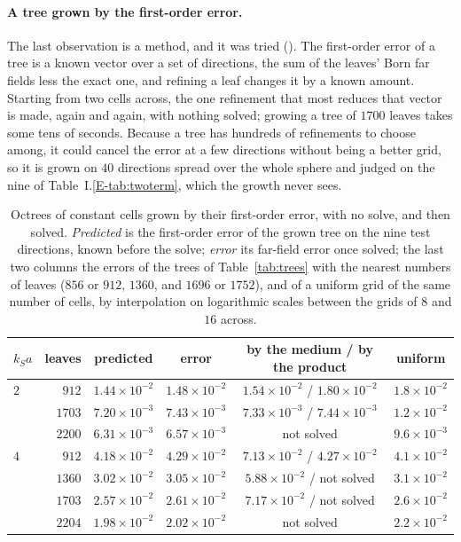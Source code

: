 \documentclass[11pt,a4paper]{article}
\begin{document}
\paragraph{A tree grown by the first-order error.} The last observation is a method, and it was tried
(). The first-order error of a tree is a known vector
over a set of directions, the sum of the leaves' Born far fields less the exact one, and refining a leaf
changes it by a known amount. Starting from two cells across, the one refinement that most reduces that
vector is made, again and again, with nothing solved; growing a tree of $1700$ leaves takes some tens of
seconds. Because a tree has hundreds of refinements to choose among, it could cancel the error at a few
directions without being a better grid, so it is grown on $40$ directions spread over the whole sphere
and judged on the nine of Table~I.\ref{E-tab:twoterm}, which the growth never sees.
\begin{table}[htbp]
\centering
\caption{Octrees of constant cells grown by their first-order error, with no solve, and then solved.
\emph{Predicted} is the first-order error of the grown tree on the nine test directions, known before the
solve; \emph{error} its far-field error once solved; the last two columns the errors of the trees of
Table~\ref{tab:trees} with the nearest numbers of leaves ($856$ or $912$, $1360$, and $1696$ or $1752$),
and of a uniform grid of the same number of cells, by interpolation on logarithmic scales between the
grids of $8$ and $16$ across.}\label{tab:greedy}
\small
\begin{tabular}{@{}lrcccc@{}}
\toprule
$k_Sa$ & leaves & predicted & error & by the medium / by the product & uniform \\
\midrule
$2$ & $912$  & $1.44\times10^{-2}$ & $1.48\times10^{-2}$ & $1.54\times10^{-2}$ / $1.80\times10^{-2}$ & $1.8\times10^{-2}$ \\
    & $1703$ & $7.20\times10^{-3}$ & $7.43\times10^{-3}$ & $7.33\times10^{-3}$ / $7.44\times10^{-3}$ & $1.2\times10^{-2}$ \\
    & $2200$ & $6.31\times10^{-3}$ & $6.57\times10^{-3}$ & not solved & $9.6\times10^{-3}$ \\
\midrule
$4$ & $912$  & $4.18\times10^{-2}$ & $4.29\times10^{-2}$ & $7.13\times10^{-2}$ / $4.27\times10^{-2}$ & $4.1\times10^{-2}$ \\
    & $1360$ & $3.02\times10^{-2}$ & $3.05\times10^{-2}$ & $5.88\times10^{-2}$ / not solved & $3.1\times10^{-2}$ \\
    & $1703$ & $2.57\times10^{-2}$ & $2.61\times10^{-2}$ & $7.17\times10^{-2}$ / not solved & $2.6\times10^{-2}$ \\
    & $2204$ & $1.98\times10^{-2}$ & $2.02\times10^{-2}$ & not solved & $2.2\times10^{-2}$ \\
\bottomrule
\end{tabular}
\end{table}
\end{document}
